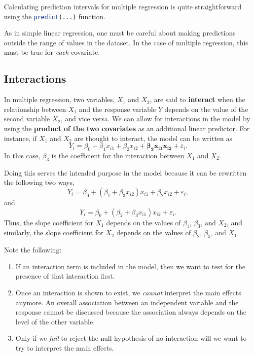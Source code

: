 \documentclass[12pt]{article}
\begin{document}
Calculating prediction intervals for multiple regression is quite straightforward using the \lstinline[language=R]{predict(...)} function.

As in simple linear regression, one must be careful about making predictions outside the range of values in the dataset. In the case of multiple regression, this must be true for \textit{each} covariate.

\subsection{Interactions}

In multiple regression, two variables, $X_1$ and $X_2$, are said to \textbf{interact} when the relationship between $X_1$ and the response variable $Y$ depends on the value of the second variable $X_2$, and vice versa. We can allow for interactions in the model by using the \textbf{product of the two covariates} as an additional linear predictor. For instance, if $X_1$ and $X_2$ are thought to interact, the model can be written as \[Y_i = \beta_0 + \beta_1 x_{i1} + 
\beta_2 x_{i2} + \mathbf{\beta_3 x_{i1} x_{i2}} + \varepsilon_i.\] In this case, $\beta_3$ is the coefficient for the interaction between $X_1$ and $X_2$.

Doing this serves the intended purpose in the model because it can be rewritten the following two ways, \[Y_i = \beta_0 + (\beta_1 + \beta_3x_{i2})x_{i1} + \beta_2 x_{i2} + \varepsilon_i,\] and \[Y_i = \beta_0 + (\beta_2 + \beta_3 x_{i1})x_{i2} + \varepsilon_i.\] Thus, the slope coefficient for $X_1$ depends on the values of $\beta_1$, $\beta_3$, and $X_2$, and similarly, the slope coefficient for $X_2$ depends on the values of $\beta_2$, $\beta_3$, and $X_1$.

Note the following:
\begin{enumerate}
    \item If an interaction term is included in the model, then we want to test for the presence of that interaction first.
    \item Once an interaction is shown to exist, we \textit{cannot} interpret the main effects anymore. An overall association between an independent variable and the response cannot be discussed because the association always depends on the level of the other variable.
    \item Only if we \textit{fail} to reject the null hypothesis of no interaction will we want to try to interpret the main effects.
\end{enumerate}
\end{document}
